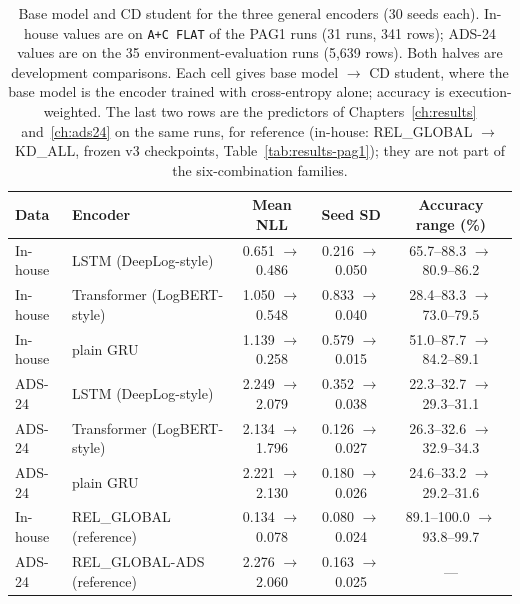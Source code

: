 \begin{table}[htbp]
\centering
\caption[Base model and CD student for the three general encoders]{Base model and CD student for the three general encoders
(30 seeds each). In-house values are on \texttt{A+C FLAT} of the
PAG1 runs (31 runs, 341 rows); ADS-24 values are on the 35
environment-evaluation runs (5,639 rows). Both halves are development
comparisons.
Each cell gives base model $\rightarrow$ CD student, where the base
model is the encoder trained with cross-entropy alone; accuracy is
execution-weighted. The last two rows are the predictors of
Chapters~\ref{ch:results} and~\ref{ch:ads24} on the same runs, for
reference (in-house: REL\_GLOBAL $\rightarrow$ KD\_ALL, frozen v3
checkpoints, Table~\ref{tab:results-pag1}); they are not part of the
six-combination families.}
\label{tab:gen-arch}
\small
\begin{tabular}{@{}llccc@{}}
\toprule
Data & Encoder & Mean NLL & Seed SD & Accuracy range (\%) \\
\midrule
In-house & LSTM (DeepLog-style)
  & 0.651 $\rightarrow$ 0.486 & 0.216 $\rightarrow$ 0.050
  & 65.7--88.3 $\rightarrow$ 80.9--86.2 \\
In-house & Transformer (LogBERT-style)
  & 1.050 $\rightarrow$ 0.548 & 0.833 $\rightarrow$ 0.040
  & 28.4--83.3 $\rightarrow$ 73.0--79.5 \\
In-house & plain GRU
  & 1.139 $\rightarrow$ 0.258 & 0.579 $\rightarrow$ 0.015
  & 51.0--87.7 $\rightarrow$ 84.2--89.1 \\
ADS-24 & LSTM (DeepLog-style)
  & 2.249 $\rightarrow$ 2.079 & 0.352 $\rightarrow$ 0.038
  & 22.3--32.7 $\rightarrow$ 29.3--31.1 \\
ADS-24 & Transformer (LogBERT-style)
  & 2.134 $\rightarrow$ 1.796 & 0.126 $\rightarrow$ 0.027
  & 26.3--32.6 $\rightarrow$ 32.9--34.3 \\
ADS-24 & plain GRU
  & 2.221 $\rightarrow$ 2.130 & 0.180 $\rightarrow$ 0.026
  & 24.6--33.2 $\rightarrow$ 29.2--31.6 \\
\midrule
In-house & REL\_GLOBAL (reference)
  & 0.134 $\rightarrow$ 0.078 & 0.080 $\rightarrow$ 0.024
  & 89.1--100.0 $\rightarrow$ 93.8--99.7 \\
ADS-24 & REL\_GLOBAL-ADS (reference)
  & 2.276 $\rightarrow$ 2.060 & 0.163 $\rightarrow$ 0.025 & --- \\
\bottomrule
\end{tabular}
\end{table}



